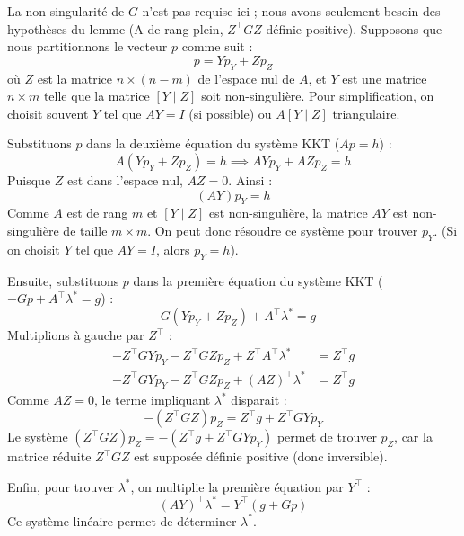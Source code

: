 La non-singularité de $G$ n'est pas requise ici ; nous avons seulement besoin des hypothèses du lemme (A de rang plein, $Z^\top G Z$ définie positive).
Supposons que nous partitionnons le vecteur $p$ comme suit :
\begin{equation}
    p = Y p_Y + Z p_Z
\end{equation}
où $Z$ est la matrice $n \times (n-m)$ de l'espace nul de $A$, et $Y$ est une matrice $n \times m$ telle que la matrice $[Y \mid Z]$ soit non-singulière.
Pour simplification, on choisit souvent $Y$ tel que $AY = I$ (si possible) ou $A [Y \mid Z]$ triangulaire.

Substituons $p$ dans la deuxième équation du système KKT ($Ap = h$) :
\begin{equation}
    A(Y p_Y + Z p_Z) = h \implies AY p_Y + AZ p_Z = h
\end{equation}
Puisque $Z$ est dans l'espace nul, $AZ = 0$. Ainsi :
\begin{equation}
    (AY) p_Y = h
\end{equation}
Comme $A$ est de rang $m$ et $[Y \mid Z]$ est non-singulière, la matrice $AY$ est non-singulière de taille $m \times m$.
On peut donc résoudre ce système pour trouver $p_Y$. (Si on choisit $Y$ tel que $AY=I$, alors $p_Y = h$).

Ensuite, substituons $p$ dans la première équation du système KKT ($ -Gp + A^\top \lambda^* = g $) :
\begin{equation}
    -G(Y p_Y + Z p_Z) + A^\top \lambda^* = g
\end{equation}
Multiplions à gauche par $Z^\top$ :
\begin{align*}
    -Z^\top G Y p_Y - Z^\top G Z p_Z + Z^\top A^\top \lambda^* &= Z^\top g \\
    -Z^\top G Y p_Y - Z^\top G Z p_Z + (AZ)^\top \lambda^* &= Z^\top g
\end{align*}
Comme $AZ=0$, le terme impliquant $\lambda^*$ disparait :
\begin{equation}
    -(Z^\top G Z) p_Z = Z^\top g + Z^\top G Y p_Y
\end{equation}
Le système $(Z^\top G Z) p_Z = -(Z^\top g + Z^\top G Y p_Y)$ permet de trouver $p_Z$, car la matrice réduite $Z^\top G Z$ est supposée définie positive (donc inversible).

Enfin, pour trouver $\lambda^*$, on multiplie la première équation par $Y^\top$ :
\begin{equation}
    (AY)^\top \lambda^* = Y^\top (g + Gp)
\end{equation}
Ce système linéaire permet de déterminer $\lambda^*$.

